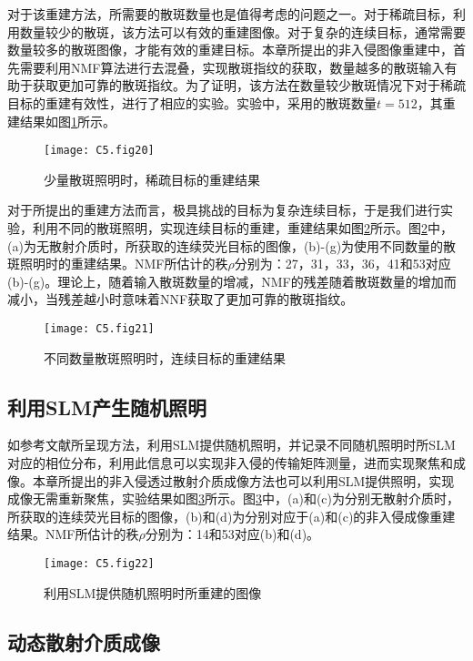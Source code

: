 对于该重建方法，所需要的散斑数量也是值得考虑的问题之一。对于稀疏目标，利用数量较少的散斑，该方法可以有效的重建图像。对于复杂的连续目标，通常需要数量较多的散斑图像，才能有效的重建目标。本章所提出的非入侵图像重建中，首先需要利用NMF算法进行去混叠，实现散斑指纹的获取，数量越多的散斑输入有助于获取更加可靠的散斑指纹。为了证明，该方法在数量较少散斑情况下对于稀疏目标的重建有效性，进行了相应的实验。实验中，采用的散斑数量$t = 512$，其重建结果如图\ref{fig:5.20}所示。

\begin{figure}[htp]
	\centering
	\texttt{[image: C5.fig20]}
	\caption{少量散斑照明时，稀疏目标的重建结果}
	\label{fig:5.20}
\end{figure}

对于所提出的重建方法而言，极具挑战的目标为复杂连续目标，于是我们进行实验，利用不同的散斑照明，实现连续目标的重建，重建结果如图\ref{fig:5.21}所示。图\ref{fig:5.21}中，(a)为无散射介质时，所获取的连续荧光目标的图像，(b)-(g)为使用不同数量的散斑照明时的重建结果。NMF所估计的秩$\rho$分别为：27，31，33，36，41和53对应(b)-(g)。理论上，随着输入散斑数量的增减，NMF的残差随着散斑数量的增加而减小，当残差越小时意味着NNF获取了更加可靠的散斑指纹。

\begin{figure}[htp]
	\centering
	\texttt{[image: C5.fig21]}
	\caption{不同数量散斑照明时，连续目标的重建结果}
	\label{fig:5.21}
\end{figure}

\subsection{利用SLM产生随机照明}

如参考文献\cite{boniface_non_invasive_2020}所呈现方法，利用SLM提供随机照明，并记录不同随机照明时所SLM对应的相位分布，利用此信息可以实现非入侵的传输矩阵测量，进而实现聚焦和成像。本章所提出的非入侵透过散射介质成像方法也可以利用SLM提供照明，实现成像无需重新聚焦，实验结果如图\ref{fig:5.22}所示。图\ref{fig:5.22}中，(a)和(c)为分别无散射介质时，所获取的连续荧光目标的图像，(b)和(d)为分别对应于(a)和(c)的非入侵成像重建结果。NMF所估计的秩$\rho$分别为：14和53对应(b)和(d)。

\begin{figure}[htp]
	\centering
	\texttt{[image: C5.fig22]}
	\caption{利用SLM提供随机照明时所重建的图像}
	\label{fig:5.22}
\end{figure}

\subsection{动态散射介质成像}

